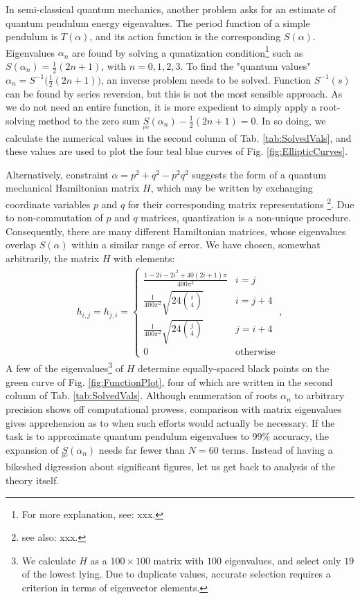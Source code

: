 \documentclass[nofootinbib,preprint]{revtex4-1}
\begin{document}
In semi-classical quantum mechanics, another problem asks for an estimate of 
quantum pendulum energy eigenvalues. The period function of a simple pendulum is $T(\alpha)$,
and its action function is the corresponding $S(\alpha)$. Eigenvalues $\alpha_n$ are 
found by solving a qunatization condition\footnote{For more explanation, see: xxx.} 
such as ${S(\alpha_n)=\frac{1}{2}(2n+1)}$, with $n=0,1,2,3$. To find the 
"quantum values" ${\alpha_n = S^{-1}\big(\frac{1}{2}(2n+1)\big)}$, an 
inverse problem needs to be solved. Function $S^{-1}(s)$ can be found by 
series reversion, but this is not the most sensible approach. As we do not need 
an entire function, it is more expedient to simply apply a root-solving method 
to the zero sum $\underset{^{pw}}{S}(\alpha_n)-\frac{1}{2}(2n+1)=0$. 
In so doing, we calculate the numerical values  in the second column of 
Tab. \ref{tab:SolvedVals}, and these values are used to plot the four teal 
blue curves of Fig. \ref{fig:EllipticCurves}.

Alternatively, constraint $\alpha=p^2+q^2-p^2 q^2$ suggests the form 
of a quantum mechanical Hamiltonian matrix $H$, which may be written by exchanging 
coordinate variables $p$ and $q$ for their corresponding matrix representations
\footnote{see also: xxx.}. 
Due to non-commutation of $p$ and $q$ matrices, quantization is a non-unique 
procedure. Consequently, there are many different Hamiltonian matrices, whose 
eigenvalues overlap $S(\alpha)$ within a similar range of error. We have 
chosen, somewhat arbitrarily, the matrix $H$ with elements:
\begin{eqnarray}
h_{i,j}= h_{j,i}= \begin{cases} 
      \frac{1 - 2 i - 2 i^2 + 40 (2 i + 1) \pi}{ 400 \pi^2} & i=j \\
       \frac{1}{400\pi^2}\sqrt{24\binom{i}{4}} & i=j+4 \\
       \frac{1}{400\pi^2}\sqrt{24\binom{j}{4}} & j=i+4 \\
      0 & \text{otherwise} 
   \end{cases}, \nonumber
\end{eqnarray} 
A few of the eigenvalues\footnote{We calculate $H$ as a $100 \times 100$ matrix with $100$ eigenvalues, 
and select only $19$ of the lowest lying. Due to duplicate values, accurate selection requires a criterion 
in terms of eigenvector elements.} of $H$ determine equally-spaced black points on the green 
curve of Fig. \ref{fig:FunctionPlot}, four of which are written in the second column 
of Tab. \ref{tab:SolvedVals}. Although enumeration of roots $\alpha_n$ to arbitrary precision 
shows off computational prowess, comparison with matrix eigenvalues gives apprehension as to 
when such efforts would actually be necessary. If the task is to approximate quantum
pendulum eigenvalues to 99\% accuracy, the expansion of $\underset{^{pw}}{S}(\alpha_n)$
needs far fewer than $N=60$ terms. Instead of having a bikeshed digression about significant
figures, let us get back to analysis of the theory itself.
\end{document}
